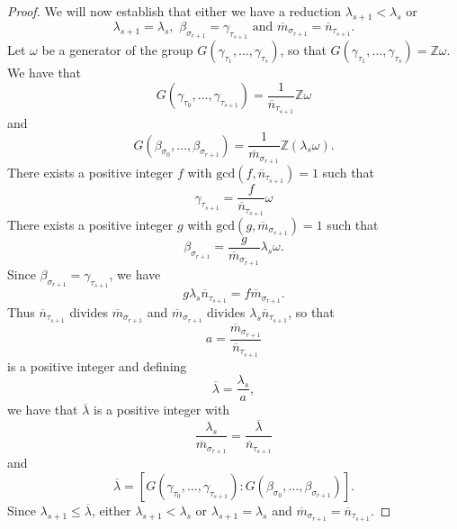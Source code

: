 \documentclass[11pt]{amsart}
\def\NZQ{\mathbb}               %
\def\ZZ{{\NZQ Z}}
\begin{document}
\begin{proof}
We will now establish that either we have a reduction $\lambda_{s+1}<\lambda_s$ or
\begin{equation}\label{eq22}
\lambda_{s+1}=\lambda_s,\,\, \beta_{\sigma_{r+1}}=\gamma_{\tau_{s+1}}\mbox{ and } \overline m_{\sigma_{r+1}}=\overline n_{\tau_{s+1}}.
\end{equation}
Let $\omega$ be a generator of the group $G(\gamma_{\tau_1},\ldots,\gamma_{\tau_s})$, so that $G(\gamma_{\tau_1},\ldots,\gamma_{\tau_s})=\ZZ\omega$. We have that
$$
G(\gamma_{\tau_0},\ldots,\gamma_{\tau_{s+1}})=\frac{1}{\overline n_{\tau_{s+1}}}\ZZ\omega
$$
and
$$
G(\beta_{\sigma_0},\ldots,\beta_{\sigma_{r+1}})=\frac{1}{\overline m_{\sigma_{r+1}}}\ZZ(\lambda_s\omega).
$$
There exists a positive integer $f$ with $\mbox{gcd}(f,\overline n_{\tau_{s+1}})=1$ such that 
$$
\gamma_{\tau_{s+1}}=\frac{f}{\overline n_{\tau_{s+1}}}\omega
$$
 There exists a positive integer $g$ with $\mbox{gcd}(g,\overline m_{\sigma_{r+1}})=1$ such that
 $$
 \beta_{\sigma_{r+1}}=\frac{g}{\overline m_{\sigma_{r+1}}}\lambda_s\omega.
 $$
 Since $\beta_{\sigma_{r+1}}=\gamma_{\tau_{s+1}}$, we have 
 $$
 g\lambda_s \overline n_{\tau_{s+1}}=f \overline m_{\sigma_{r+1}}.
 $$
 Thus $\overline n_{\tau_{s+1}}$ divides $\overline m_{\sigma_{r+1}}$ and $\overline m_{\sigma_{r+1}}$ divides $\lambda_s \overline n_{\tau_{s+1}}$, so that
 $$
 a=\frac{\overline m_{\sigma_{r+1}}}{\overline n_{\tau_{s+1}}}
 $$
 is a positive integer and defining
 $$
 \overline\lambda=\frac{\lambda_s}{a},
 $$
 we have that $\overline\lambda$ is a positive integer with
 $$
 \frac{\lambda_s}{\overline m_{\sigma_{r+1}}}=\frac{\overline \lambda}{\overline n_{\tau_{s+1}}}
 $$
 and 
 $$
 \overline\lambda =[G(\gamma_{\tau_0},\ldots,\gamma_{\tau_{s+1}}):G(\beta_{\sigma_0},\ldots,\beta_{\sigma_{r+1}})].
 $$
 Since $\lambda_{s+1}\le \overline\lambda$,  either $\lambda_{s+1}<\lambda_s$ or $\lambda_{s+1}=\lambda_s$ and $\overline m_{\sigma_{r+1}}=\overline n_{\tau_{s+1}}$.
 

\end{proof}
\end{document}
